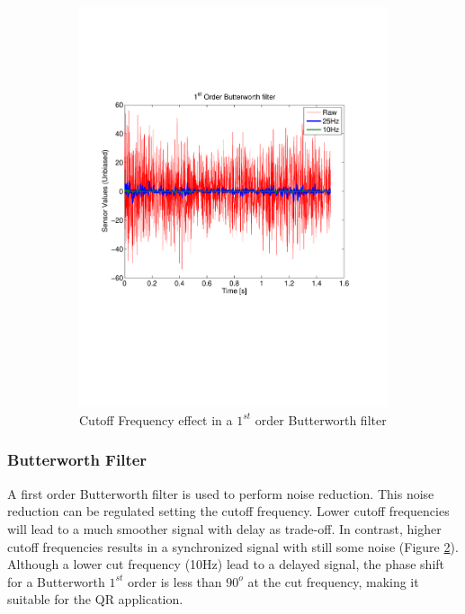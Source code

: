\documentclass{article}
\begin{document}
\begin{figure}[ht]
\begin{subfigure}[b]{0.49\textwidth}
		\includegraphics[trim = 0mm 50mm 0mm 40mm, width=\linewidth]{Figures/NoiseComp}
		\caption{Cutoff Frequency effect in a $1^{st}$ order Butterworth filter}
		\label{fig.NoiseComp}
	\end{subfigure}
	\caption{}
\end{figure}

\subsubsection{Butterworth Filter}

A first order Butterworth filter is used to perform noise reduction. This noise reduction can be regulated setting the cutoff frequency. Lower cutoff frequencies will lead to a much smoother signal with delay as trade-off. In contrast, higher cutoff frequencies results in a synchronized signal with still some noise (Figure \ref{fig.NoiseComp}). Although a lower cut frequency (10Hz) lead to a delayed signal, the phase shift for a Butterworth $1^{st}$ order is less than $90^{o}$ at the cut frequency, making it suitable for the QR application. 
\end{document}
